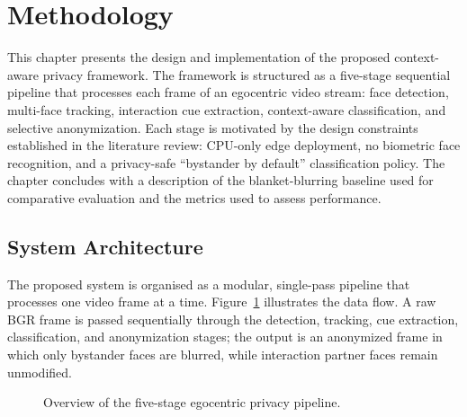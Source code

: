 
\section{Methodology}

This chapter presents the design and implementation of the proposed context-aware
privacy framework. The framework is structured as a five-stage sequential pipeline that
processes each frame of an egocentric video stream: face detection, multi-face tracking,
interaction cue extraction, context-aware classification, and selective anonymization.
Each stage is motivated by the design constraints established in the literature review:
CPU-only edge deployment, no biometric face recognition, and a privacy-safe
``bystander by default'' classification policy. The chapter concludes with a description
of the blanket-blurring baseline used for comparative evaluation and the metrics used to
assess performance.

\subsection{System Architecture}

The proposed system is organised as a modular, single-pass pipeline that processes
one video frame at a time. Figure~\ref{fig:pipeline} illustrates the data flow. A raw
BGR frame is passed sequentially through the detection, tracking, cue extraction,
classification, and anonymization stages; the output is an anonymized frame in which
only bystander faces are blurred, while interaction partner faces remain unmodified.

\begin{figure}[htbp]
  \centering
  \caption{Overview of the five-stage egocentric privacy pipeline.}
  \label{fig:pipeline}
\end{figure}

